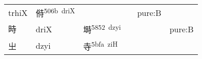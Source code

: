 \documentclass[14pt,a4paper]{scrartcl}
\begin{document}
\begin{longtable}[c]{@{}llllll@{}}
\begin{minipage}[t]{0.14\columnwidth}
trhiX
\strut\end{minipage} &
\begin{minipage}[t]{0.14\columnwidth}\raggedright\strut
偫\textsuperscript{506b~driX}
\strut\end{minipage} &
\begin{minipage}[t]{0.14\columnwidth}\raggedright\strut
\strut\end{minipage} &
\begin{minipage}[t]{0.14\columnwidth}\raggedright\strut
\strut\end{minipage} &
\begin{minipage}[t]{0.14\columnwidth}\raggedright\strut
pure:B
\strut\end{minipage}\tabularnewline
\begin{minipage}[t]{0.14\columnwidth}\raggedright\strut
時
\strut\end{minipage} &
\begin{minipage}[t]{0.14\columnwidth}\raggedright\strut
driX
\strut\end{minipage} &
\begin{minipage}[t]{0.14\columnwidth}\raggedright\strut
塒\textsuperscript{5852~dzyi}
\strut\end{minipage} &
\begin{minipage}[t]{0.14\columnwidth}\raggedright\strut
\strut\end{minipage} &
\begin{minipage}[t]{0.14\columnwidth}\raggedright\strut
\strut\end{minipage} &
\begin{minipage}[t]{0.14\columnwidth}\raggedright\strut
pure:B
\strut\end{minipage}\tabularnewline
\begin{minipage}[t]{0.14\columnwidth}\raggedright\strut
㞢
\strut\end{minipage} &
\begin{minipage}[t]{0.14\columnwidth}\raggedright\strut
dzyi
\strut\end{minipage} &
\begin{minipage}[t]{0.14\columnwidth}\raggedright\strut
寺\textsuperscript{5bfa~ziH}
\strut\end{minipage} &
\begin{minipage}[t]{0.14\columnwidth}\raggedright\strut
\strut\end{minipage} &
\begin{minipage}[t]{0.14\columnwidth}\raggedright\strut
\strut\end{minipage} &
\begin{minipage}[t]{0.14\columnwidth}\raggedright\strut

\end{minipage}
\end{longtable}
\end{document}
